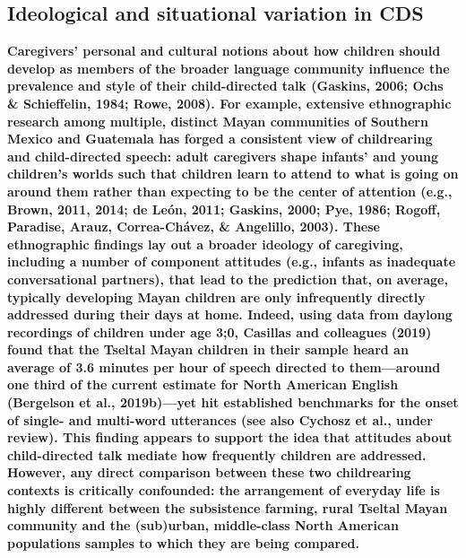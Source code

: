 \documentclass[,man,floatsintext]{apa6}
\begin{document}
\subsection{Ideological and situational variation in
CDS}\label{ideological-and-situational-variation-in-cds}

\textbf{Caregivers' personal and cultural notions about how children
should develop as members of the broader language community influence
the prevalence and style of their child-directed talk (Gaskins, 2006;
Ochs \& Schieffelin, 1984; Rowe, 2008). For example, extensive
ethnographic research among multiple, distinct Mayan communities of
Southern Mexico and Guatemala has forged a consistent view of
childrearing and child-directed speech: adult caregivers shape infants'
and young children's worlds such that children learn to attend to what
is going on around them rather than expecting to be the center of
attention (e.g., Brown, 2011, 2014; de León, 2011; Gaskins, 2000; Pye,
1986; Rogoff, Paradise, Arauz, Correa-Chávez, \& Angelillo, 2003). These
ethnographic findings lay out a broader ideology of caregiving,
including a number of component attitudes (e.g., infants as inadequate
conversational partners), that lead to the prediction that, on average,
typically developing Mayan children are only infrequently directly
addressed during their days at home. Indeed, using data from daylong
recordings of children under age 3;0, Casillas and colleagues (2019)
found that the Tseltal Mayan children in their sample heard an average
of 3.6 minutes per hour of speech directed to them---around one third of
the current estimate for North American English (Bergelson et al.,
2019b)---yet hit established benchmarks for the onset of single- and
multi-word utterances (see also Cychosz et al., under review). This
finding appears to support the idea that attitudes about child-directed
talk mediate how frequently children are addressed. However, any direct
comparison between these two childrearing contexts is critically
confounded: the arrangement of everyday life is highly different between
the subsistence farming, rural Tseltal Mayan community and the
(sub)urban, middle-class North American populations samples to which
they are being compared.}
\end{document}
